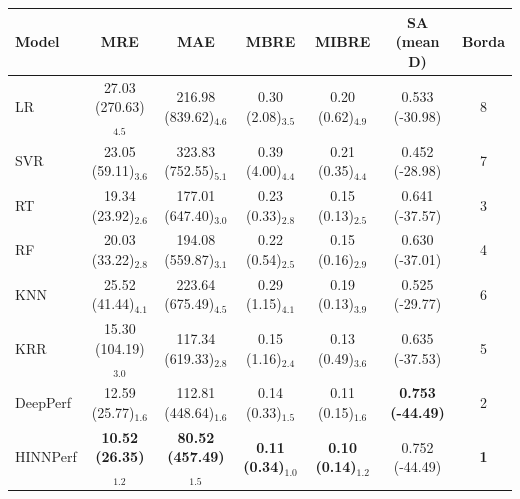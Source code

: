 \begin{tabular}{lcccccc}
\toprule
Model & MRE & MAE & MBRE & MIBRE & SA (mean D) & Borda \\
\midrule
LR & 27.03 (270.63)$_{4.5}$ & 216.98 (839.62)$_{4.6}$ & 0.30 (2.08)$_{3.5}$ & 0.20 (0.62)$_{4.9}$ & 0.533 (-30.98) & 8 \\
SVR & 23.05 (59.11)$_{3.6}$ & 323.83 (752.55)$_{5.1}$ & 0.39 (4.00)$_{4.4}$ & 0.21 (0.35)$_{4.4}$ & 0.452 (-28.98) & 7 \\
RT & 19.34 (23.92)$_{2.6}$ & 177.01 (647.40)$_{3.0}$ & 0.23 (0.33)$_{2.8}$ & 0.15 (0.13)$_{2.5}$ & 0.641 (-37.57) & 3 \\
RF & 20.03 (33.22)$_{2.8}$ & 194.08 (559.87)$_{3.1}$ & 0.22 (0.54)$_{2.5}$ & 0.15 (0.16)$_{2.9}$ & 0.630 (-37.01) & 4 \\
KNN & 25.52 (41.44)$_{4.1}$ & 223.64 (675.49)$_{4.5}$ & 0.29 (1.15)$_{4.1}$ & 0.19 (0.13)$_{3.9}$ & 0.525 (-29.77) & 6 \\
KRR & 15.30 (104.19)$_{3.0}$ & 117.34 (619.33)$_{2.8}$ & 0.15 (1.16)$_{2.4}$ & 0.13 (0.49)$_{3.6}$ & 0.635 (-37.53) & 5 \\
DeepPerf & 12.59 (25.77)$_{1.6}$ & 112.81 (448.64)$_{1.6}$ & 0.14 (0.33)$_{1.5}$ & 0.11 (0.15)$_{1.6}$ & \textbf{0.753 (-44.49)} & 2 \\
HINNPerf & \textbf{10.52 (26.35)$_{1.2}$} & \textbf{80.52 (457.49)$_{1.5}$} & \textbf{0.11 (0.34)$_{1.0}$} & \textbf{0.10 (0.14)$_{1.2}$} & 0.752 (-44.49) & \textbf{1} \\
\bottomrule
\end{tabular}
